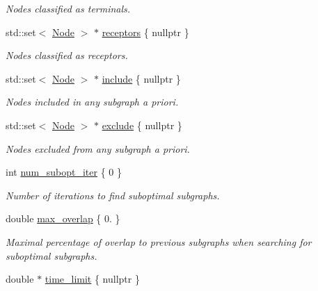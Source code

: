 \begin{DoxyCompactItemize}
\begin{DoxyCompactList}\small\item\em Nodes classified as \textquotesingle{}terminals\textquotesingle{}. \end{DoxyCompactList}\item 
std\+::set$<$ \hyperlink{namespacederegnet_a744bad34f2de9856d36715a445f027f3}{Node} $>$ $\ast$ \hyperlink{classderegnet_1_1DeregnetData_a470cc9f84741c59897ab1e7a3daa1205}{receptors} \{ nullptr \}
\begin{DoxyCompactList}\small\item\em Nodes classified as \textquotesingle{}receptors\textquotesingle{}. \end{DoxyCompactList}\item 
std\+::set$<$ \hyperlink{namespacederegnet_a744bad34f2de9856d36715a445f027f3}{Node} $>$ $\ast$ \hyperlink{classderegnet_1_1DeregnetData_a438d16e60be5d119d174aa039f070ab2}{include} \{ nullptr \}
\begin{DoxyCompactList}\small\item\em Nodes included in any subgraph a priori. \end{DoxyCompactList}\item 
std\+::set$<$ \hyperlink{namespacederegnet_a744bad34f2de9856d36715a445f027f3}{Node} $>$ $\ast$ \hyperlink{classderegnet_1_1DeregnetData_a8e4398e6ece11ef87767914c6f2c304d}{exclude} \{ nullptr \}
\begin{DoxyCompactList}\small\item\em Nodes excluded from any subgraph a priori. \end{DoxyCompactList}\item 
int \hyperlink{classderegnet_1_1DeregnetData_adb7428cd99112156ae9f80187af9ebbe}{num\+\_\+subopt\+\_\+iter} \{ 0 \}
\begin{DoxyCompactList}\small\item\em Number of iterations to find suboptimal subgraphs. \end{DoxyCompactList}\item 
double \hyperlink{classderegnet_1_1DeregnetData_a43111d8664fd9db36f36f75b24ba62e9}{max\+\_\+overlap} \{ 0. \}
\begin{DoxyCompactList}\small\item\em Maximal percentage of overlap to previous subgraphs when searching for suboptimal subgraphs. \end{DoxyCompactList}\item 
double $\ast$ \hyperlink{classderegnet_1_1DeregnetData_ac378faf7e8466135b8dc0ced907d98ae}{time\+\_\+limit} \{ nullptr \}

\end{DoxyCompactItemize}
